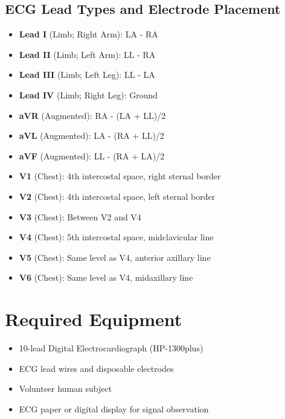 \documentclass[11pt]{article}
\begin{document}
\subsection*{ECG Lead Types and Electrode Placement}
\begin{itemize}
    \item \textbf{Lead I} (Limb; Right Arm): LA - RA
    \item \textbf{Lead II} (Limb; Left Arm): LL - RA
    \item \textbf{Lead III} (Limb; Left Leg): LL - LA
    \item \textbf{Lead IV} (Limb; Right Leg): Ground
    \item \textbf{aVR} (Augmented): RA - (LA + LL)/2
    \item \textbf{aVL} (Augmented): LA - (RA + LL)/2
    \item \textbf{aVF} (Augmented): LL - (RA + LA)/2
    \item \textbf{V1} (Chest): 4th intercostal space, right sternal border
    \item \textbf{V2} (Chest): 4th intercostal space, left sternal border
    \item \textbf{V3} (Chest): Between V2 and V4
    \item \textbf{V4} (Chest): 5th intercostal space, midclavicular line
    \item \textbf{V5} (Chest): Same level as V4, anterior axillary line
    \item \textbf{V6} (Chest): Same level as V4, midaxillary line
\end{itemize}

\section*{Required Equipment}
\begin{itemize}
    \item 10-lead Digital Electrocardiograph (HP-1300plus)
    \item ECG lead wires and disposable electrodes
    \item Volunteer human subject
    \item ECG paper or digital display for signal observation
\end{itemize}
\end{document}
